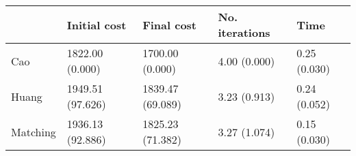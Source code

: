 \begin{tabular}{lllll}
\toprule
{} &      Initial cost &        Final cost & No. iterations &          Time \\
\midrule
Cao      &   1822.00 (0.000) &   1700.00 (0.000) &   4.00 (0.000) &  0.25 (0.030) \\
Huang    &  1949.51 (97.626) &  1839.47 (69.089) &   3.23 (0.913) &  0.24 (0.052) \\
Matching &  1936.13 (92.886) &  1825.23 (71.382) &   3.27 (1.074) &  0.15 (0.030) \\
\bottomrule
\end{tabular}
